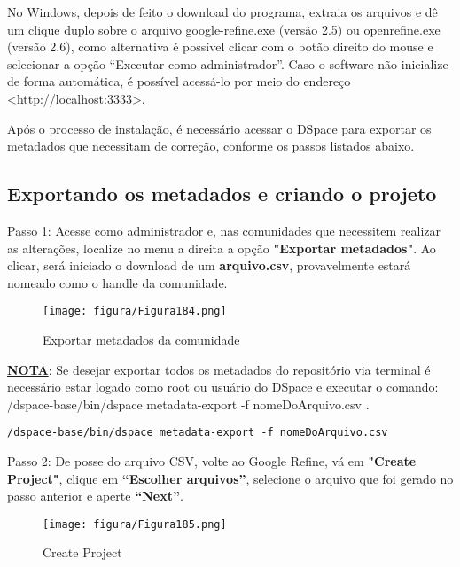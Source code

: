 \documentclass[12pt,hidelinks]{article}
\begin{document}
    No Windows, depois de feito o download do programa, extraia os arquivos e dê um clique duplo sobre o arquivo google-refine.exe (versão 2.5) ou openrefine.exe (versão 2.6), como alternativa é possível clicar com o botão direito do mouse e selecionar a opção “Executar como administrador”. Caso o software não inicialize de forma automática, é possível acessá-lo por meio do endereço <http://localhost:3333>.
    
    Após o processo de instalação, é necessário acessar o DSpace para exportar os metadados que necessitam de correção, conforme os passos listados abaixo.
    
    \subsection{Exportando os metadados e criando o projeto}
    
    Passo 1: Acesse como administrador e, nas comunidades que necessitem realizar as alterações, localize no menu a direita a opção \textbf{"Exportar metadados"}. Ao clicar, será iniciado o download de um \textbf{arquivo.csv}, provavelmente estará nomeado como o handle da comunidade.

\newpage

    \begin{figure}[!htp]
                \centering
                \texttt{[image: figura/Figura184.png]}
                \caption{Exportar metadados da comunidade}
            \label{Rotulo}
        \end{figure}
    
    \underline{\textbf{NOTA}}: Se desejar exportar todos os metadados do repositório via terminal é necessário estar logado como root ou usuário do DSpace e executar o comando: /dspace-base/bin/dspace metadata-export -f nomeDoArquivo.csv .
    
    \begin{verbatim}
/dspace-base/bin/dspace metadata-export -f nomeDoArquivo.csv
        \end{verbatim}
    
    Passo 2: De posse do arquivo CSV, volte ao Google Refine, vá em \textbf{"Create Project"}, clique em \textbf{“Escolher arquivos”}, selecione o arquivo que foi gerado no passo anterior e aperte \textbf{“Next”}.
    
    \begin{figure}[!htp]
                \centering
                \texttt{[image: figura/Figura185.png]}
                \caption{Create Project}
            \label{Rotulo}
        \end{figure}
\end{document}
